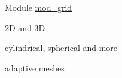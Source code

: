 
\begin{DoxyRefList}
\item[Module \mbox{\hyperlink{namespacemod__grid}{mod\+\_\+grid}} ]\label{todo__todo000001}%
%

\begin{DoxyItemize}
\item 2D and 3D
\item cylindrical, spherical and more
\item adaptive meshes 
\end{DoxyItemize}
\end{DoxyRefList}